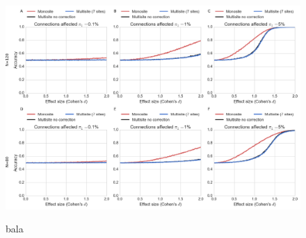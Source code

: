\documentclass[authoryear]{elsarticle}
\begin{document}
\begin{figure}[tbp]
\centering
\captionsetup[subfloat]{labelformat=empty}
{\includegraphics[width=\textwidth]{../figures/prediction_effectsize.png}}
\caption{
bala
}
\label{fig_prediction_sampeffect}
\end{figure}
\end{document}
